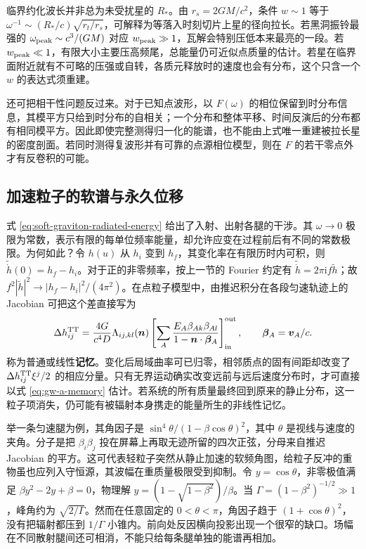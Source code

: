 临界约化波长并非总为未受扰星的 $R_*$。由 $r_s=2GM/c^2$，条件 $w\sim1$ 等于 $\omega^{-1}\sim(R_*/c)\sqrt{r_t/r_s}$，可解释为等落入时刻切片上星的径向拉长。若黑洞振铃最强的 $\omega_{\rm peak}\sim c^3/(GM)$ 对应 $w_{\rm peak}\gg1$，瓦解会特别压低本来最亮的一段。若 $w_{\rm peak}\ll1$，有限大小主要压高频尾，总能量仍可近似点质量的估计。若星在临界面附近就有不可略的压强或自转，各质元释放时的速度也会有分布，这个只含一个 $w$ 的表达式须重建。

还可把相干性问题反过来。对于已知点波形，以 $F(\omega)$ 的相位保留到时分布信息，其模平方只给到时分布的自相关；一个分布和整体平移、时间反演后的分布都有相同模平方。因此即使完整测得归一化的能谱，也不能由上式唯一重建被拉长星的密度剖面。若同时测得复波形并有可靠的点源相位模型，则在 $F$ 的若干零点外才有反卷积的可能。

\subsection{加速粒子的软谱与永久位移}

式 \eqref{eq:soft-graviton-radiated-energy} 给出了入射、出射各腿的干涉。其 $\omega\to0$ 极限为常数，表示有限的每单位频率能量，却允许应变在过程前后有不同的常数极限。为何如此？令 $h(u)$ 从 $h_i$ 变到 $h_f$，其变化率在有限历时内可积，则 $\widetilde{\dot h}(0)=h_f-h_i$。对于正的非零频率，按上一节的 Fourier 约定有 $\widetilde{\dot h}=2\pi\mathrm i f\widetilde h$；故 $f^2|\widetilde h|^2\to |h_f-h_i|^2/(4\pi^2)$。在点粒子模型中，由推迟积分在各段匀速轨迹上的 Jacobian 可把这个差直接写为
\begin{equation}
 \Delta h_{ij}^{\rm TT}
   =\frac{4G}{c^4D}\Lambda_{ij,kl}(\bm n)
     \left[\sum_A\frac{E_A\beta_{Ak}\beta_{Al}}
                            {1-\bm n\cdot\bm\beta_A}\right]_{\rm in}^{\rm out},
 \qquad \bm\beta_A=\bm v_A/c .
 \label{eq:gw-a-memory}
\end{equation}
称为普通或线性\textbf{记忆}。变化后局域曲率可已归零，相邻质点的固有间距却改变了 $\Delta h_{ij}^{\rm TT}\xi^j/2$ 的相应分量。只有无界运动确实改变远前与远后速度分布时，才可直接以式 \eqref{eq:gw-a-memory} 估计。若系统的所有质量最终回到原来的静止分布，这一粒子项消失，仍可能有被辐射本身携走的能量所生的非线性记忆。

举一条匀速腿为例，其角因子是 $\sin^4\theta/(1-\beta\cos\theta)^2$，其中 $\theta$ 是视线与速度的夹角。分子是把 $\beta_i\beta_j$ 投在屏幕上再取无迹所留的四次正弦，分母来自推迟 Jacobian 的平方。这可代表轻粒子突然从静止加速的软频角图，给粒子反冲的重物虽也应列入守恒源，其波幅在重质量极限受到抑制。令 $y=\cos\theta$，非零极值满足 $\beta y^2-2y+\beta=0$，物理解 $y=(1-\sqrt{1-\beta^2})/\beta$。当 $\Gamma=(1-\beta^2)^{-1/2}\gg1$，峰角约为 $\sqrt{2/\Gamma}$。然而在任意固定的 $0<\theta<\pi$，角因子趋于 $(1+\cos\theta)^2$，没有把辐射都压到 $1/\Gamma$ 小锥内。前向处反因横向投影出现一个很窄的缺口。场幅在不同散射腿间还可相消，不能只给每条腿单独的能谱再相加。

